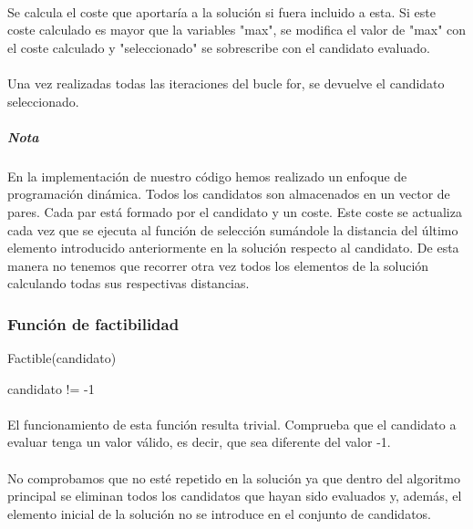 \documentclass{article}
\begin{document}
	\paragraph{}Se calcula el coste que aportaría a la solución si fuera incluido a esta. Si este coste calculado es mayor que la variables "max", se modifica el valor de "max" con el coste calculado y "seleccionado" se sobrescribe con el candidato evaluado.
	
	\paragraph{}Una vez realizadas todas las iteraciones del bucle for, se devuelve el candidato seleccionado.
	
	\subparagraph{Nota}En la implementación de nuestro código hemos realizado un enfoque de programación dinámica. Todos los candidatos son almacenados en un vector de pares. Cada par está formado por el candidato y un coste. Este coste se actualiza cada vez que se ejecuta al función de selección sumándole la distancia del último elemento introducido anteriormente en la solución respecto al candidato. De esta manera no tenemos que recorrer otra vez todos los elementos de la solución calculando todas sus respectivas distancias.

	\subsubsection{Función de factibilidad}
	\begin{algorithm}[H]
		\caption{Factible(candidato)}
		\begin{algorithmic}
			\RETURN candidato != -1
		\end{algorithmic}
	\end{algorithm}

	\paragraph{}El funcionamiento de esta función resulta trivial. Comprueba que el candidato a evaluar tenga un valor válido, es decir, que sea diferente del valor -1. 
	
	\paragraph{}No comprobamos que no esté repetido en la solución ya que dentro del algoritmo principal se eliminan todos los candidatos que hayan sido evaluados y, además, el elemento inicial de la solución no se introduce en el conjunto de candidatos. 
	
\end{document}
